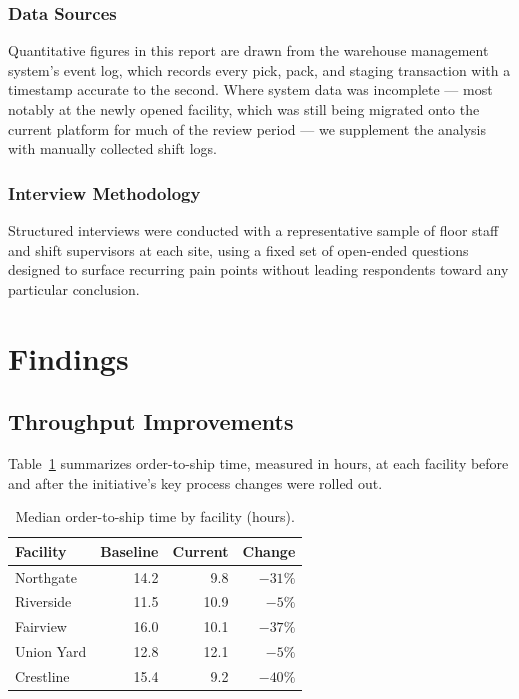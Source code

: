 \documentclass[11pt]{article}
\begin{document}
\subsubsection{Data Sources}
Quantitative figures in this report are drawn from the warehouse management
system's event log, which records every pick, pack, and staging
transaction with a timestamp accurate to the second. Where system data was
incomplete --- most notably at the newly opened facility, which was still
being migrated onto the current platform for much of the review period ---
we supplement the analysis with manually collected shift logs.

\subsubsection{Interview Methodology}
Structured interviews were conducted with a representative sample of
floor staff and shift supervisors at each site, using a fixed set of
open-ended questions designed to surface recurring pain points without
leading respondents toward any particular conclusion.

\section{Findings}

\subsection{Throughput Improvements}
Table~\ref{tab:throughput} summarizes order-to-ship time, measured in
hours, at each facility before and after the initiative's key process
changes were rolled out.

\begin{table}[h]
\centering
\caption{Median order-to-ship time by facility (hours).}
\label{tab:throughput}
\begin{tabular}{@{}lrrr@{}}
\toprule
Facility & Baseline & Current & Change \\
\midrule
Northgate    & 14.2 & 9.8  & $-31\%$ \\
Riverside    & 11.5 & 10.9 & $-5\%$  \\
Fairview     & 16.0 & 10.1 & $-37\%$ \\
Union Yard   & 12.8 & 12.1 & $-5\%$  \\
Crestline    & 15.4 & 9.2  & $-40\%$ \\
\bottomrule
\end{tabular}
\end{table}
\end{document}
